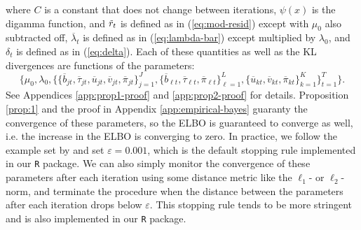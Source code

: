 where $C$ is a constant that does not change between iterations, $\psi(x)$ is the digamma function, and $\Tilde{r}_t$ is defined as in (\ref{eq:mod-resid}) except with $\mu_0$ also subtracted off, $\overline{\lambda}_t$ is defined as in (\ref{eq:lambda-bar}) except multiplied by $\lambda_0$, and $\delta_t$ is defined as in (\ref{eq:delta}). Each of these quantities as well as the KL divergences are functions of the parameters: $$\{\mu_0,\lambda_0,\{\{\overline{b}_{jt}, \overline{\tau}_{jt}, \overline{u}_{jt}, \overline{v}_{jt}, \overline{\pi}_{jt}\}_{j=1}^J, \{\overline{b}_{\ell t}, \overline{\tau}_{\ell t}, \overline{\pi}_{\ell t}\}_{\ell=1}^L, \{\overline{u}_{kt}, \overline{v}_{kt}, \overline{\pi}_{kt}\}_{k=1}^K\}_{t=1}^T\}.$$ See Appendices \ref{app:prop1-proof} and \ref{app:prop2-proof} for details. Proposition \ref{prop:1} and the proof in Appendix \ref{app:empirical-bayes} guaranty the convergence of these parameters, so the ELBO is guaranteed to converge as well, i.e. the increase in the ELBO is converging to zero. In practice, we follow the example set by \cite{Wang20} and set $\varepsilon = 0.001$, which is the default stopping rule implemented in our \texttt{R} package. We can also simply monitor the convergence of these parameters after each iteration using some distance metric like the $\ell_1$- or $\ell_2$-norm, and terminate the procedure when the distance between the parameters after each iteration drops below $\varepsilon$. This stopping rule tends to be more stringent and is also implemented in our \texttt{R} package.